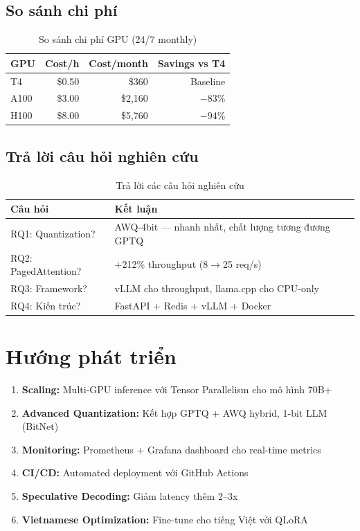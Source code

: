 \documentclass[12pt,a4paper]{report}
\begin{document}
\subsection{So sánh chi phí}

\begin{table}[h]
\centering
\caption{So sánh chi phí GPU (24/7 monthly)}
\label{tab:cost-comparison}
\begin{tabular}{lrrr}
\toprule
\textbf{GPU} & \textbf{Cost/h} & \textbf{Cost/month} & \textbf{Savings vs T4} \\
\midrule
T4 & \$0.50 & \$360 & Baseline \\
A100 & \$3.00 & \$2,160 & $-$83\% \\
H100 & \$8.00 & \$5,760 & $-$94\% \\
\bottomrule
\end{tabular}
\end{table}

\subsection{Trả lời câu hỏi nghiên cứu}

\begin{table}[h]
\centering
\caption{Trả lời các câu hỏi nghiên cứu}
\label{tab:research-answers}
\begin{tabular}{p{3cm}p{9.5cm}}
\toprule
\textbf{Câu hỏi} & \textbf{Kết luận} \\
\midrule
RQ1: Quantization? & AWQ-4bit --- nhanh nhất, chất lượng tương đương GPTQ \\
RQ2: PagedAttention? & $+$212\% throughput (8$\rightarrow$25 req/s) \\
RQ3: Framework? & vLLM cho throughput, llama.cpp cho CPU-only \\
RQ4: Kiến trúc? & FastAPI + Redis + vLLM + Docker \\
\bottomrule
\end{tabular}
\end{table}

\section{Hướng phát triển}

\begin{enumerate}
  \item \textbf{Scaling:} Multi-GPU inference với Tensor Parallelism cho mô hình 70B+
  \item \textbf{Advanced Quantization:} Kết hợp GPTQ + AWQ hybrid, 1-bit LLM (BitNet)
  \item \textbf{Monitoring:} Prometheus + Grafana dashboard cho real-time metrics
  \item \textbf{CI/CD:} Automated deployment với GitHub Actions
  \item \textbf{Speculative Decoding:} Giảm latency thêm 2--3x
  \item \textbf{Vietnamese Optimization:} Fine-tune cho tiếng Việt với QLoRA
\end{enumerate}
\end{document}
